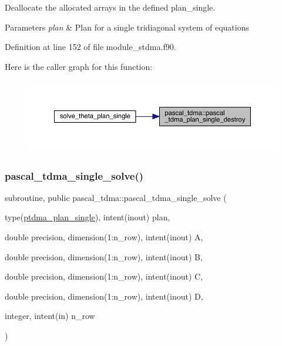 Deallocate the allocated arrays in the defined plan\+\_\+single. 


\begin{DoxyParams}{Parameters}
{\em plan} & Plan for a single tridiagonal system of equations \\
\hline
\end{DoxyParams}


Definition at line 152 of file module\+\_\+stdma.\+f90.

Here is the caller graph for this function\+:
\nopagebreak
\begin{figure}[H]
\begin{center}
\leavevmode
\includegraphics[width=350pt]{namespacepascal__tdma_adb04e59c740ce6c4b9518dd86eaeb594_icgraph}
\end{center}
\end{figure}
\mbox{\label{namespacepascal__tdma_ab14e132231d4b53fd65dd333ccc85a50}} 
\subsubsection{\texorpdfstring{pascal\_tdma\_single\_solve()}{pascal\_tdma\_single\_solve()}}
{\footnotesize\ttfamily subroutine, public pascal\+\_\+tdma\+::pascal\+\_\+tdma\+\_\+single\+\_\+solve (\begin{DoxyParamCaption}\item[{type(\mbox{\hyperlink{structpascal__tdma_1_1ptdma__plan__single}{ptdma\+\_\+plan\+\_\+single}}), intent(inout)}]{plan,  }\item[{double precision, dimension(1\+:n\+\_\+row), intent(inout)}]{A,  }\item[{double precision, dimension(1\+:n\+\_\+row), intent(inout)}]{B,  }\item[{double precision, dimension(1\+:n\+\_\+row), intent(inout)}]{C,  }\item[{double precision, dimension(1\+:n\+\_\+row), intent(inout)}]{D,  }\item[{integer, intent(in)}]{n\+\_\+row }\end{DoxyParamCaption})}



